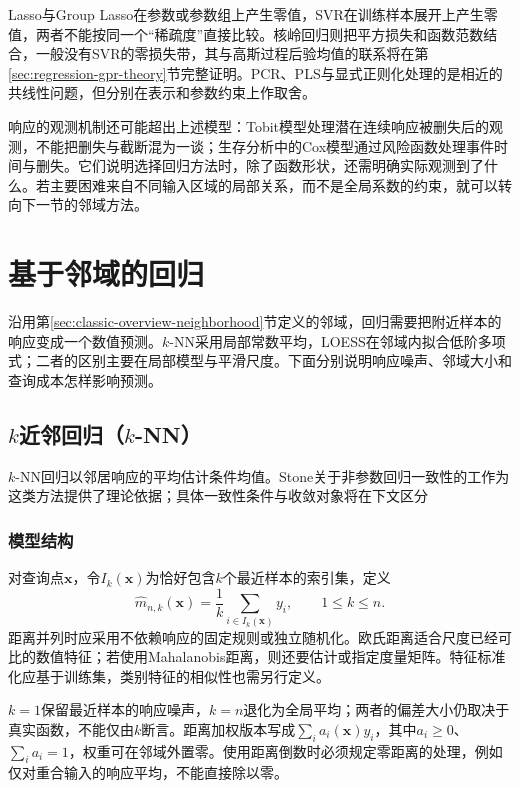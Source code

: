 Lasso与Group Lasso在参数或参数组上产生零值，SVR在训练样本展开上产生零值，两者不能按同一个“稀疏度”直接比较。核岭回归则把平方损失和函数范数结合，一般没有SVR的零损失带，其与高斯过程后验均值的联系将在第\ref{sec:regression-gpr-theory}节完整证明。PCR、PLS与显式正则化处理的是相近的共线性问题，但分别在表示和参数约束上作取舍。

响应的观测机制还可能超出上述模型：Tobit模型处理潜在连续响应被删失后的观测，不能把删失与截断混为一谈；生存分析中的Cox模型通过风险函数处理事件时间与删失。它们说明选择回归方法时，除了函数形状，还需明确实际观测到了什么。若主要困难来自不同输入区域的局部关系，而不是全局系数的约束，就可以转向下一节的邻域方法。

\section{基于邻域的回归}
\label{sec:regression-instance}

沿用第\ref{sec:classic-overview-neighborhood}节定义的邻域，回归需要把附近样本的响应变成一个数值预测。$k$-NN采用局部常数平均，LOESS在邻域内拟合低阶多项式；二者的区别主要在局部模型与平滑尺度。下面分别说明响应噪声、邻域大小和查询成本怎样影响预测。

\subsection{$k$近邻回归（$k$-NN）}
\label{sec:regression-knn}

$k$-NN回归以邻居响应的平均估计条件均值。Stone关于非参数回归一致性的工作为这类方法提供了理论依据；具体一致性条件与收敛对象将在下文区分

\subsubsection{模型结构}

对查询点$\bm{x}$，令$I_k(\bm{x})$为恰好包含$k$个最近样本的索引集，定义
\begin{equation}
  \widehat m_{n,k}(\bm{x})=\frac1k\sum_{i\in I_k(\bm{x})}y_i,
  \qquad 1\leq k\leq n.
  \label{eq:regression-knn}
\end{equation}
距离并列时应采用不依赖响应的固定规则或独立随机化。欧氏距离适合尺度已经可比的数值特征；若使用Mahalanobis距离，则还要估计或指定度量矩阵。特征标准化应基于训练集，类别特征的相似性也需另行定义。

$k=1$保留最近样本的响应噪声，$k=n$退化为全局平均；两者的偏差大小仍取决于真实函数，不能仅由$k$断言。距离加权版本写成$\sum_i a_i(\bm{x})y_i$，其中$a_i\geq0$、$\sum_i a_i=1$，权重可在邻域外置零。使用距离倒数时必须规定零距离的处理，例如仅对重合输入的响应平均，不能直接除以零。

